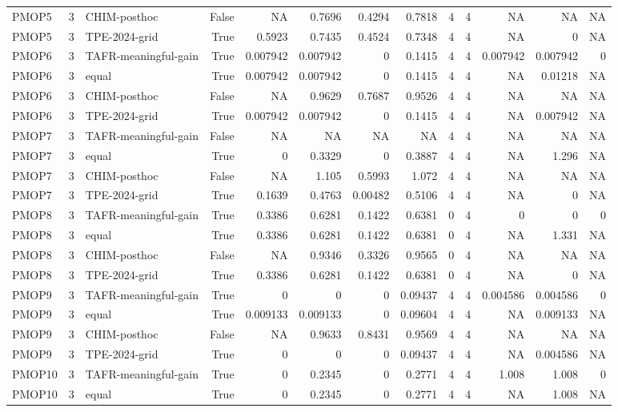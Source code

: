 \begin{tabular}{lrlrrrrrrrrrr}
PMOP5 & 3 & CHIM-posthoc & False & NA & 0.7696 & 0.4294 & 0.7818 & 4 & 4 & NA & NA & NA \\
PMOP5 & 3 & TPE-2024-grid & True & 0.5923 & 0.7435 & 0.4524 & 0.7348 & 4 & 4 & NA & 0 & NA \\
PMOP6 & 3 & TAFR-meaningful-gain & True & 0.007942 & 0.007942 & 0 & 0.1415 & 4 & 4 & 0.007942 & 0.007942 & 0 \\
PMOP6 & 3 & equal & True & 0.007942 & 0.007942 & 0 & 0.1415 & 4 & 4 & NA & 0.01218 & NA \\
PMOP6 & 3 & CHIM-posthoc & False & NA & 0.9629 & 0.7687 & 0.9526 & 4 & 4 & NA & NA & NA \\
PMOP6 & 3 & TPE-2024-grid & True & 0.007942 & 0.007942 & 0 & 0.1415 & 4 & 4 & NA & 0.007942 & NA \\
PMOP7 & 3 & TAFR-meaningful-gain & False & NA & NA & NA & NA & 4 & 4 & NA & NA & NA \\
PMOP7 & 3 & equal & True & 0 & 0.3329 & 0 & 0.3887 & 4 & 4 & NA & 1.296 & NA \\
PMOP7 & 3 & CHIM-posthoc & False & NA & 1.105 & 0.5993 & 1.072 & 4 & 4 & NA & NA & NA \\
PMOP7 & 3 & TPE-2024-grid & True & 0.1639 & 0.4763 & 0.00482 & 0.5106 & 4 & 4 & NA & 0 & NA \\
PMOP8 & 3 & TAFR-meaningful-gain & True & 0.3386 & 0.6281 & 0.1422 & 0.6381 & 0 & 4 & 0 & 0 & 0 \\
PMOP8 & 3 & equal & True & 0.3386 & 0.6281 & 0.1422 & 0.6381 & 0 & 4 & NA & 1.331 & NA \\
PMOP8 & 3 & CHIM-posthoc & False & NA & 0.9346 & 0.3326 & 0.9565 & 0 & 4 & NA & NA & NA \\
PMOP8 & 3 & TPE-2024-grid & True & 0.3386 & 0.6281 & 0.1422 & 0.6381 & 0 & 4 & NA & 0 & NA \\
PMOP9 & 3 & TAFR-meaningful-gain & True & 0 & 0 & 0 & 0.09437 & 4 & 4 & 0.004586 & 0.004586 & 0 \\
PMOP9 & 3 & equal & True & 0.009133 & 0.009133 & 0 & 0.09604 & 4 & 4 & NA & 0.009133 & NA \\
PMOP9 & 3 & CHIM-posthoc & False & NA & 0.9633 & 0.8431 & 0.9569 & 4 & 4 & NA & NA & NA \\
PMOP9 & 3 & TPE-2024-grid & True & 0 & 0 & 0 & 0.09437 & 4 & 4 & NA & 0.004586 & NA \\
PMOP10 & 3 & TAFR-meaningful-gain & True & 0 & 0.2345 & 0 & 0.2771 & 4 & 4 & 1.008 & 1.008 & 0 \\
PMOP10 & 3 & equal & True & 0 & 0.2345 & 0 & 0.2771 & 4 & 4 & NA & 1.008 & NA \\

\end{tabular}
